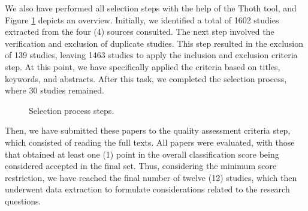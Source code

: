 We also have performed all selection steps with the help of the Thoth tool, and Figure \ref{fig:selectionSteps} depicts an overview.
Initially, we identified a total of 1602 studies extracted from the four (4) sources consulted.
The next step involved the verification and exclusion of duplicate studies.
This step resulted in the exclusion of 139 studies, leaving 1463 studies to apply the inclusion and exclusion criteria step.
At this point, we have specifically applied the criteria based on titles, keywords, and abstracts.
After this task, we completed the selection process, where 30 studies remained.

\begin{figure}[!htb]
    \centering
    \caption{Selection process steps.}
    \label{fig:selectionSteps}
    
\end{figure}

Then, we have submitted these papers to the quality assessment criteria step, which consisted of reading the full texts.
All papers were evaluated, with those that obtained at least one (1) point in the overall classification score being considered accepted in the final set.
Thus, considering the minimum score restriction, we have reached the final number of twelve (12) studies, which then underwent data extraction to formulate considerations related to the research questions.

